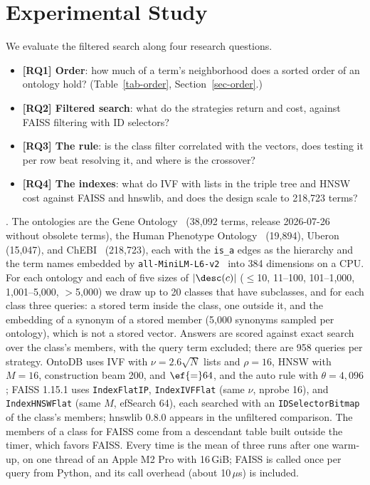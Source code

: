 \section{Experimental Study}
\label{sec-exp}

We evaluate the filtered search along four research questions.
\begin{itemize}
\item \textbf{[RQ1] Order}: how much of a term's neighborhood does a sorted order of an
  ontology hold? (Table~\ref{tab-order}, Section~\ref{sec-order}.)
\item \textbf{[RQ2] Filtered search}: what do the strategies return and cost, against
  FAISS filtering with ID selectors?
\item \textbf{[RQ3] The rule}: is the class filter correlated with the vectors, does testing
  it per row beat resolving it, and where is the crossover?
\item \textbf{[RQ4] The indexes}: what do IVF with lists in the triple tree and HNSW cost
  against FAISS and hnswlib, and does the design scale to 218,723 terms?
\end{itemize}

.
The ontologies are the Gene Ontology~\cite{ashburner2000} (38,092 terms, release
2026-07-26 without obsolete terms), the Human Phenotype Ontology~\cite{kohler2021}
(19,894), Uberon~\cite{mungall2012} (15,047), and ChEBI~\cite{hastings2016} (218,723),
each with the \texttt{is\_a} edges as the hierarchy and the term names embedded by
\texttt{all-MiniLM-L6-v2}~\cite{reimers2019} into 384 dimensions on a CPU.
For each ontology and each of five sizes of $|\desc(c)|$ ($\le$10, 11--100, 101--1,000,
1,001--5,000, $>$5,000) we draw up to 20 classes that have subclasses, and for each class
three queries: a stored term inside the class, one outside it, and the embedding of a
synonym of a stored member (5,000 synonyms sampled per ontology), which is not a stored
vector.
Answers are scored against exact search over the class's members, with the query term
excluded; there are 958 queries per strategy.
OntoDB uses IVF with $\nu=2.6\sqrt N$ lists and $\rho=16$, HNSW with $M{=}16$,
construction beam 200, and $\ef{=}64$, and the auto rule with $\theta=4{,}096$; FAISS
1.15.1 uses \texttt{IndexFlatIP}, \texttt{IndexIVFFlat} (same $\nu$, nprobe 16), and
\texttt{IndexHNSWFlat} (same $M$, efSearch 64), each searched with an
\texttt{IDSelectorBitmap} of the class's members; hnswlib 0.8.0 appears in the unfiltered
comparison.
The members of a class for FAISS come from a descendant table built outside the timer,
which favors FAISS.
Every time is the mean of three runs after one warm-up, on one thread of an Apple M2 Pro
with 16\,GiB; FAISS is called once per query from Python, and its call overhead (about
10\,$\mu$s) is included.


